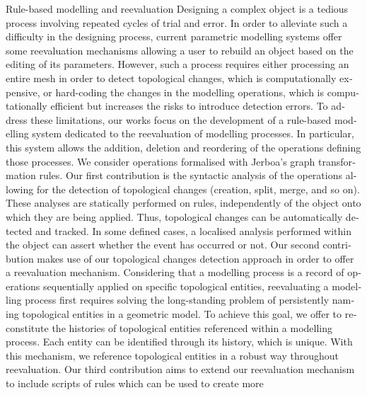 \vspace{0.5em}

\begin{otherlanguage}{english} %
	\begin{resume}{Rule-based modelling and reevaluation}
	  \justifying%
	  Designing a complex object is a tedious process involving repeated cycles
	  of trial and error. In order to alleviate such a difficulty in the
	  designing process, current parametric modelling systems offer some
	  reevaluation mechanisms allowing a user to rebuild an object based on the
	  editing of its parameters. However, such a process requires either
	  processing an entire mesh in order to detect topological changes, which is
	  computationally expensive, or hard-coding the changes in the modelling
	  operations, which is computationally efficient but increases the risks to
	  introduce detection errors. To address these limitations, our works focus
	  on the development of a rule-based modelling system dedicated to the
	  reevaluation of modelling processes. In particular, this system allows the
	  addition, deletion and reordering of the operations defining those
	  processes. %
	  We consider operations formalised with Jerboa's graph transformation
	  rules. Our first contribution is the syntactic analysis of the operations
	  allowing for the detection of topological changes (creation, split, merge,
	  and so on). These analyses are statically performed on rules,
	  independently of the object onto which they are being applied. Thus,
	  topological changes can be automatically detected and tracked. In some
	  defined cases, a localised analysis performed within the object can assert
	  whether the event has occurred or not. Our second contribution makes use
	  of our topological changes detection approach in order to offer a
	  reevaluation mechanism. Considering that a modelling process is a record
	  of operations sequentially applied on specific topological entities,
	  reevaluating a modelling process first requires solving the long-standing
	  problem of persistently naming topological entities in a geometric model.
	  To achieve this goal, we offer to reconstitute the histories of
	  topological entities referenced within a modelling process. Each entity
	  can be identified through its history, which is unique. With this
	  mechanism, we reference topological entities in a robust way throughout
	  reevaluation. Our third contribution aims to extend our reevaluation
	  mechanism to include scripts of rules which can be used to create more

\end{resume}
\end{otherlanguage}

